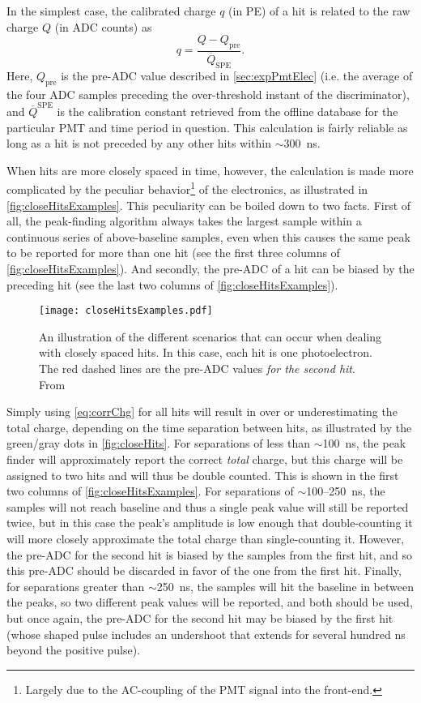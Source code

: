 \documentclass[../thesis.tex]{subfiles}
\begin{document}
In the simplest case, the calibrated charge $q$ (in PE) of a hit is related to the raw charge $Q$ (in ADC counts) as
\begin{equation}
  \label{eq:corrChg}
  q = \frac{Q - Q_{\mathrm{pre}}}{\overline Q_{\mathrm{SPE}}}.
\end{equation}
Here, $Q_{\mathrm{pre}}$ is the pre-ADC value described in \autoref{sec:expPmtElec} (i.e. the average of the four ADC samples preceding the over-threshold instant of the discriminator), and $\overline Q^{\mathrm{SPE}}$ is the calibration constant retrieved from the offline database for the particular PMT and time period in question. This calculation is fairly reliable as long as a hit is not preceded by any other hits within $\sim$300~ns.

When hits are more closely spaced in time, however, the calculation is made more complicated by the peculiar behavior\footnote{Largely due to the AC-coupling of the PMT signal into the front-end.} of the electronics, as illustrated in \autoref{fig:closeHitsExamples}. This peculiarity can be boiled down to two facts. First of all, the peak-finding algorithm always takes the largest sample within a continuous series of above-baseline samples, even when this causes the same peak to be reported for more than one hit (see the first three columns of \autoref{fig:closeHitsExamples}). And secondly, the pre-ADC of a hit can be biased by the preceding hit (see the last two columns of \autoref{fig:closeHitsExamples}). 

\begin{figure}[ht]
  \texttt{[image: closeHitsExamples.pdf]}
  \caption{An illustration of the different scenarios that can occur when dealing with closely spaced hits. In this case, each hit is one photoelectron. The red dashed lines are the pre-ADC values \emph{for the second hit}. From \cite{closeHits}}
  \label{fig:closeHitsExamples}
\end{figure}

Simply using \autoref{eq:corrChg} for all hits will result in over or underestimating the total charge, depending on the time separation between hits, as illustrated by the green/gray dots in \autoref{fig:closeHits}. For separations of less than $\sim$100~ns, the peak finder will approximately report the correct \emph{total} charge, but this charge will be assigned to two hits and will thus be double counted. This is shown in the first two columns of \autoref{fig:closeHitsExamples}. For separations of $\sim$100--250~ns, the samples will not reach baseline and thus a single peak value will still be reported twice, but in this case the peak's amplitude is low enough that double-counting it will more closely approximate the total charge than single-counting it. However, the pre-ADC for the second hit is biased by the samples from the first hit, and so this pre-ADC should be discarded in favor of the one from the first hit. Finally, for separations greater than $\sim$250~ns, the samples will hit the baseline in between the peaks, so two different peak values will be reported, and both should be used, but once again, the pre-ADC for the second hit may be biased by the first hit (whose shaped pulse includes an undershoot that extends for several hundred ns beyond the positive pulse).
\end{document}
